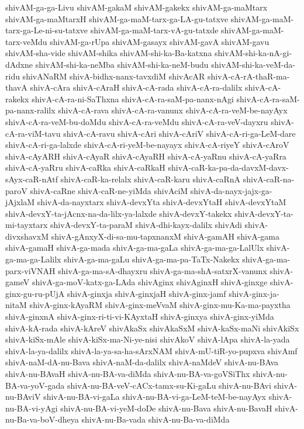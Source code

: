 {shivAM-ga-ga-Livu
shivAM-gakaM
shivAM-gakekx
shivAM-ga-maMtarx
shivAM-ga-maMtarxH
shivAM-ga-maM-tarx-ga-LA-gu-tatxve
shivAM-ga-maM-tarx-ga-Le-ni-su-tatxve
shivAM-ga-maM-tarx-vA-gu-tatxde
shivAM-ga-maM-tarx-veMdu
shivAM-ga-rUpa
shivAM-gasayx
shivAM-gavA
shivAM-gavu
shivAM-sha-vide
shivAM-shika
shivAM-shi-ka-Ba-katxna
shivAM-shi-ka-nA-gi-dAdxne
shivAM-shi-ka-neMba
shivAM-shi-ka-neM-budu
shivAM-shi-ka-veM-da-ridu
shivANaRM
shivA-bidhx-nanx-tavxdiM
shivAcAR
shivA-cA-rA-thaR-ma-thavA
shivA-cAra
shivA-cAraH
shivA-cA-rada
shivA-cA-ra-dalilx
shivA-cA-rakekx
shivA-cA-ra-ni-SaThxna
shivA-cA-ra-saM-pa-nanx-nAgi
shivA-cA-ra-saM-pa-nanx-ralilx
shivA-cA-rava
shivA-cA-ra-vanunx
shivA-cA-ra-veM-be-nayAyx
shivA-cA-ra-veM-bu-doMdu
shivA-cA-ra-veMdu
shivA-cA-ra-veV-dayxru
shivA-cA-ra-viM-tavu
shivA-cA-ravu
shivA-cAri
shivA-cAriV
shivA-cA-ri-ga-LeM-dare
shivA-cA-ri-ga-lalxde
shivA-cA-ri-yeM-be-nayayx
shivA-cA-riyeY
shivA-cAroV
shivA-cAyARH
shivA-cAyaR
shivA-cAyaRH
shivA-cA-yaRnu
shivA-cA-yaRra
shivA-cA-yaRru
shivA-caRka
shivA-caRkaH
shivA-caR-ka-pa-da-davxM-davx-sAyx-caR-nAtf
shivA-caR-ka-relalx
shivA-caR-karu
shivA-caRnA
shivA-caR-na-paroV
shivA-caRne
shivA-caR-ne-yiMda
shivAciM
shivA-da-nayx-jajx-ga-jAjxlaM
shivA-da-nayxtarx
shivA-devxYta
shivA-devxYtaH
shivA-devxYtaM
shivA-devxY-ta-jAcnx-na-da-lilx-ya-lalxde
shivA-devxY-takekx
shivA-devxY-ta-mi-tayxtarx
shivA-devxY-ta-paraM
shivA-dhi-kayx-dalilx
shivAdi
shivA-divxshavxM
shivA-gAnxyX-di-sa-mu-tapxnanxM
shivA-gamAH
shivA-gama
shivA-gamaH
shivA-ga-mada
shivA-ga-ma-gaLa
shivA-ga-ma-ga-LalUlx
shivA-ga-ma-ga-Lalilx
shivA-ga-ma-gaLu
shivA-ga-ma-pa-TaTx-Nakekx
shivA-ga-ma-parx-viVNAH
shivA-ga-ma-sA-dhayxru
shivA-ga-ma-shA-satxrX-vanunx
shivA-gameV
shivA-ga-moV-katx-ga-LAda
shivAginx
shivAginxH
shivA-ginxge
shivA-ginx-gu-ru-pUjA
shivA-ginxja
shivA-ginxjaH
shivA-ginx-jamf
shivA-ginx-ja-nitaM
shivA-ginx-kAyaRM
shivA-ginx-meVvaM
shivA-ginx-mu-Ka-ma-payxtha
shivA-ginxnA
shivA-ginx-ri-ti-vi-KAyxtaH
shivA-ginxya
shivA-ginx-yiMda
shivA-kA-rada
shivA-kAreV
shivAkaSx
shivAkaSxM
shivA-kaSx-maNi
shivAkiSx
shivA-kiSx-mAle
shivA-kiSx-ma-Ni-ye-nisi
shivAkoV
shivA-lApa
shivA-la-yada
shivA-la-ya-dalilx
shivA-la-ya-sa-ha-sArxNAM
shivA-mU-tiR-yo-pupxva
shivAmf
shivA-naM-dA-nu-Bava
shivA-naM-da-dalilx
shivA-naMdeV
shivA-nu-BAva
shivA-nu-BAvaH
shivA-nu-BA-va-diMda
shivA-nu-BA-va-goVSiThx
shivA-nu-BA-va-yoV-gada
shivA-nu-BA-veV-cACx-tamx-su-Ki-gaLu
shivA-nu-BAvi
shivA-nu-BAviV
shivA-nu-BA-vi-gaLa
shivA-nu-BA-vi-ga-LeM-teM-be-nayAyx
shivA-nu-BA-vi-yAgi
shivA-nu-BA-vi-yeM-doDe
shivA-nu-Bava
shivA-nu-BavaH
shivA-nu-Ba-va-boV-dheya
shivA-nu-Ba-vada
shivA-nu-Ba-va-diMda
}
